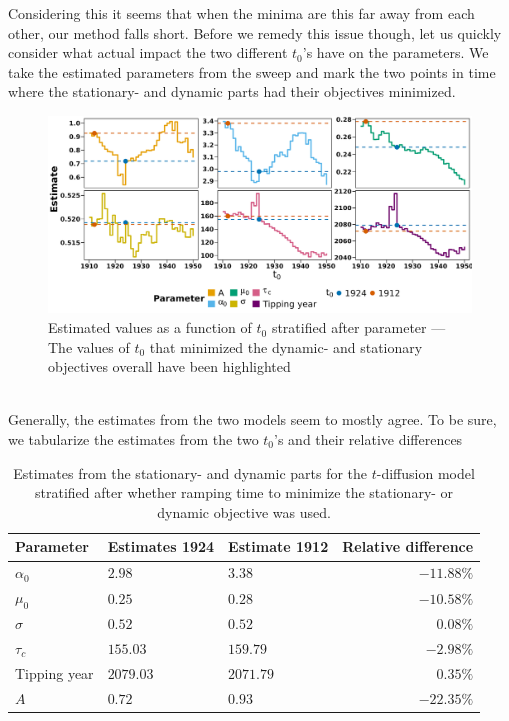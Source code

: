Considering this it seems that when the minima are this far away from each other, our method falls short. Before we remedy this issue though, let us quickly consider what actual impact the two different $t_0$'s have on the parameters. We take the estimated parameters from the sweep and mark the two points in time where the stationary- and dynamic parts had their objectives minimized.
\begin{figure}[h!]
    \begin{center}
        \includegraphics[scale = .09]{figures/estimators_full_plot.jpeg}
        \caption{Estimated values as a function of $t_0$ stratified after parameter — The values of $t_0$ that minimized the dynamic- and stationary objectives overall have been highlighted}
    \end{center}
    \label{figure:AMOC_estimates_t_0}
\end{figure}\\
Generally, the estimates from the two models seem to mostly agree. To be sure, we tabularize the estimates from the two $t_0$'s and their relative differences
\begin{table}[h!]
    \centering
    \begin{tabular}{lllr}
     Parameter & Estimates 1924 & Estimate 1912 & Relative difference \\ \hline
    $\alpha_0$ & $2.98$ & 3$.38$ & $-11.88\%$ \\ 
      $\mu_0$ & $0.25$ & $0.28$ & $-10.58\%$ \\ 
      $\sigma$ & $0.52$ & $0.52$ & 0$.08\%$ \\ 
      $\tau_c$ & $155.03$ & $159.79$ & $-2.98\%$ \\ 
      Tipping year & $2079.03$ & $2071.79$ & $0.35\%$\\ 
      $A$ & $0.72$ & $0.93$ & $-22.35\%$ \\ 
       \hline
    \end{tabular}
    \caption{Estimates from the stationary- and dynamic parts for the $t$-diffusion model stratified after whether ramping time to minimize the stationary- or dynamic objective was used.}
    \label{table:Estimates_t0_AMOC}
\end{table}\\

